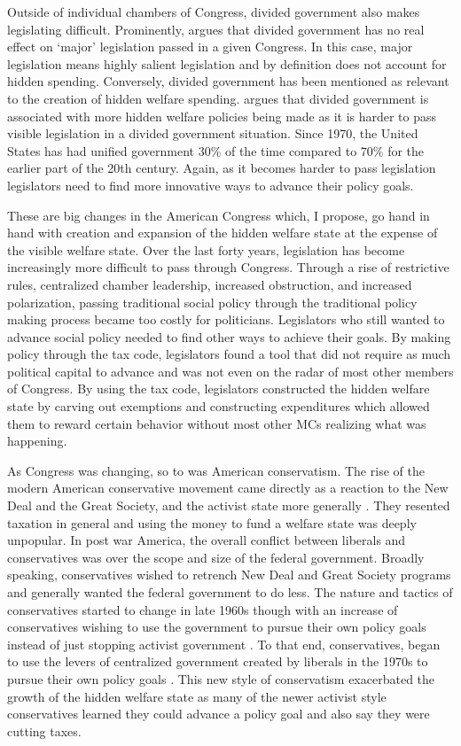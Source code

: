 \documentclass[12pt]{article}
\begin{document}
Outside of individual chambers of Congress, divided government also makes legislating difficult. Prominently, \cite{mayhew1990} argues that divided government has no real effect on `major' legislation passed in a given Congress. In this case, major legislation means highly salient legislation and by definition does not account for hidden spending. Conversely, divided government has been mentioned as relevant to the creation of hidden welfare spending. \citet[Ch. 4]{howard2008} argues that divided government is associated with more hidden welfare policies being made as it is harder to pass visible legislation in a divided government situation. Since 1970, the United States has had unified government 30\% of the time compared to 70\% for the earlier part of the 20th century. Again, as it becomes harder to pass legislation legislators need to find more innovative ways to advance their policy goals.

These are big changes in the American Congress which, I propose, go hand in hand with creation and expansion of the hidden welfare state at the expense of the visible welfare state. Over the last forty years, legislation has become increasingly more difficult to pass through Congress. Through a rise of restrictive rules, centralized chamber leadership, increased obstruction, and increased polarization, passing traditional social policy through the traditional policy making process became too costly for politicians. Legislators who still wanted to advance social policy needed to find other ways to achieve their goals. By making policy through the tax code, legislators found a tool that did not require as much political capital to advance and was not even on the radar of most other members of Congress. By using the tax code, legislators constructed the hidden welfare state by carving out exemptions and constructing expenditures which allowed them to reward certain behavior without most other MCs realizing what was happening. 

As Congress was changing, so to was American conservatism. The rise of the modern American conservative movement came directly as a reaction to the New Deal and the Great Society, and the activist state more generally \citep{critchlow2007, zelizer2010}. They resented taxation in general and using the money to fund a welfare state was deeply unpopular. In post war America, the overall conflict between liberals and conservatives was over the scope and size of the federal government. Broadly speaking, conservatives wished to retrench New Deal and Great Society programs and generally wanted the federal government to do less. The nature and tactics of conservatives started to change in late 1960s though with an increase of conservatives wishing to use the government to pursue their own policy goals instead of just stopping activist government \citep{teles2007, skocpol2007}. To that end, conservatives, began to use the levers of centralized government created by liberals in the 1970s to pursue their own policy goals \citep{hacker2004}. This new style of conservatism exacerbated the growth of the hidden welfare state as many of the newer activist style conservatives learned they could advance a policy goal and also say they were cutting taxes.
\end{document}
